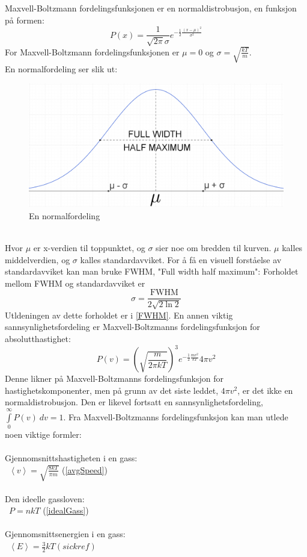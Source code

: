 \documentclass[reprint,english,notitlepage]{revtex4-1}
\begin{document}
	Maxvell-Boltzmann fordelingsfunksjonen er en normaldistrobusjon, en funksjon på formen:
	$$
		P(x) = \frac{1}{\sqrt{2\pi}\sigma}e^{-\frac{1}{2}\frac{(x - \mu)^2}{\sigma^2}}
	$$
	For Maxvell-Boltzmann fordelingsfunksjonen er $\mu = 0$ og $\sigma = \sqrt{\frac{kT}{m}}$. \\
	En normalfordeling ser slik ut:
	\begin{figure}[h]
		\centering
		\caption{En normalfordeling}
		\includegraphics[scale=0.7]{../normal_distribution}
	\end{figure} \\
	Hvor $\mu$ er x-verdien til toppunktet, og $\sigma$ sier noe om bredden til kurven.
	$\mu$ kalles middelverdien, og $\sigma$ kalles standardavviket. For å få en
	visuell forståelse av standardavviket kan man bruke FWHM, "Full width half maximum":
	Forholdet mellom FWHM og standardavviket er
	$$\sigma = \frac{\text{FWHM}}{2\sqrt{2\ln{2}}}$$
	Utldeningen av dette forholdet er i \ref{FWHM}.
	\vspace{0.25cm}
	En annen viktig sannsynlighetsfordeling er Maxvell-Boltzmanns fordelingsfunksjon
	for absolutthastighet:
	$$
		P(v) = \left(\sqrt{\frac{m}{2\pi k T}}\right)^3 e^{-\frac{1}{2}\frac{mv^2}{kT}} 4\pi v^2
	$$
	Denne likner på Maxvell-Boltzmanns fordelingsfunksjon for hastighetskomponenter,
	men på grunn av det siste leddet, $4\pi v^2$, er det ikke en normaldistrobusjon.
	Den er likevel fortsatt en sannsynlighetsfordeling, $\int\limits_{0}^{\infty} P(v)\ dv = 1$.
	Fra Maxvell-Boltzmanns fordelingsfunksjon kan man utlede noen viktige formler: \\
	\\
	Gjennomsnittshastigheten i en gass: \\
	\ $\left<v\right> = \sqrt{\frac{8kT}{\pi m}}$ (\ref{avgSpeed}) \\
	\\
	Den ideelle gassloven: \\
	\ $P = nkT$ (\ref{idealGass}) \\
	\\
	Gjennomsnittsenergien i en gass: \\
	\ $\left<E\right> = \frac{3}{2}kT (sick ref)$
\end{document}
